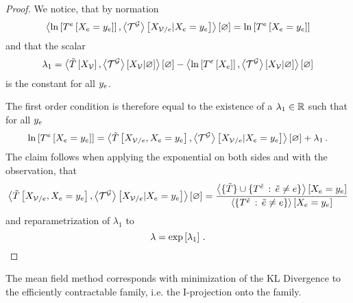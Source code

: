 \begin{proof}
	We notice, that by normation
		\[ \left\langle \ln \left[ T^{e}\left[X_{e}=y_{e}\right] \right], \left\langle \mathcal{T}^{\mathcal{G}}\right\rangle \left[ X_{\mathcal{V}/e} | X_{e}=y_{e} \right]\right\rangle \left[ \varnothing \right] =  \ln \left[ T^{e}\left[X_{e}=y_{e}\right] \right] \]
	and that the scalar
		\[ \lambda_1 = \left\langle \tilde{T}\left[X_{\mathcal{V}}\right],\left\langle \mathcal{T}^{\mathcal{G}}\right\rangle \left[ X_{\mathcal{V}} | \varnothing \right]\right\rangle \left[ \varnothing \right]	
		- \left\langle \ln \left[ T^{e}\left[X_{e}\right] \right],\left\langle \mathcal{T}^{\mathcal{G}}\right\rangle \left[ X_{\mathcal{V}} | \varnothing \right]\right\rangle \left[ \varnothing \right]	\]
	is the constant for all $y_{e}$.
	
	The first order condition is therefore equal to the existence of a $\lambda_1\in\mathbb{R}$ such that for all $y_{e}$ 
	\begin{align*}
		\ln \left[ T^{e}\left[X_{e}=y_{e}\right] \right]
		= 	\left\langle \tilde{T}\left[X_{\mathcal{V}/e},X_{e}=y_{e}\right], 
		\left\langle \mathcal{T}^{\mathcal{G}}\right\rangle \left[ X_{\mathcal{V}/e} | X_{e}=y_{e} \right]\right\rangle \left[ \varnothing \right] + \lambda_1 \, . 
	\end{align*}
	The claim follows when applying the exponential on both sides and with the observation, that 
	\begin{align*}
	\left\langle \tilde{T}\left[X_{\mathcal{V}/e},X_{e}=y_{e}\right], 
		\left\langle \mathcal{T}^{\mathcal{G}}\right\rangle \left[ X_{\mathcal{V}/e} | X_{e}=y_{e} \right]\right\rangle \left[ \varnothing \right]
		= 
		\frac{\left\langle \{\tilde{T}\}\cup\{T^{\tilde{e}} \, : \, \tilde{e}\neq e\}\right\rangle \left[ X_{e}=y_{e} \right] }{
		\left\langle \{T^{\tilde{e}} \, : \, \tilde{e}\neq e\}\right\rangle \left[ X_{e}=y_{e} \right] 
		}
	\end{align*}
	and reparametrization of $\lambda_1$ to
		\[ \lambda = \mathrm{exp}\left[\lambda_1\right] \, . \]
\end{proof}

The mean field method corresponds with minimization of the KL Divergence to the efficiently contractable family, i.e. the I-projection onto the family.

